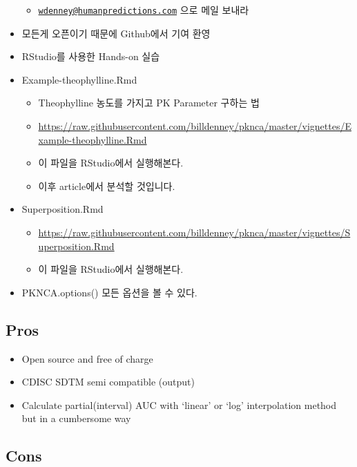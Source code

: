 \documentclass[
  12pt,
]{krantz}
\providecommand{\tightlist}{%
  \setlength{\itemsep}{0pt}\setlength{\parskip}{0pt}}
\begin{document}
\begin{itemize}
  \begin{itemize}
  \tightlist
  \item
    \href{mailto:wdenney@humanpredictions.com}{\nolinkurl{wdenney@humanpredictions.com}} 으로 메일 보내라
  \end{itemize}
\item
  모든게 오픈이기 때문에 Github에서 기여 환영
\item
  RStudio를 사용한 Hands-on 실습
\item
  Example-theophylline.Rmd

  \begin{itemize}
  \tightlist
  \item
    Theophylline 농도를 가지고 PK Parameter 구하는 법
  \item
    \url{https://raw.githubusercontent.com/billdenney/pknca/master/vignettes/Example-theophylline.Rmd}
  \item
    이 파일을 RStudio에서 실행해본다.
  \item
    이후 article에서 분석할 것입니다.
  \end{itemize}
\item
  Superposition.Rmd

  \begin{itemize}
  \tightlist
  \item
    \url{https://raw.githubusercontent.com/billdenney/pknca/master/vignettes/Superposition.Rmd}
  \item
    이 파일을 RStudio에서 실행해본다.
  \end{itemize}
\item
  PKNCA.options() 모든 옵션을 볼 수 있다.
\end{itemize}

\hypertarget{pros-1}{%
\subsection{Pros}\label{pros-1}}

\begin{itemize}
\tightlist
\item
  Open source and free of charge
\item
  CDISC SDTM semi compatible (output)
\item
  Calculate partial(interval) AUC with `linear' or `log' interpolation method but in a cumbersome way
\end{itemize}

\hypertarget{cons-1}{%
\subsection{Cons}\label{cons-1}}
\end{document}
